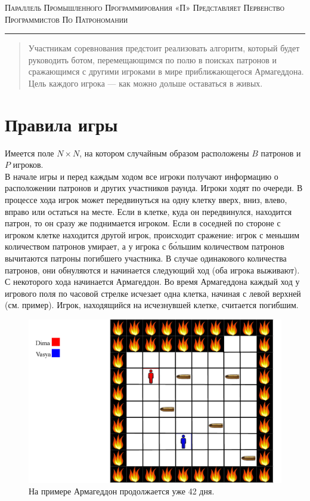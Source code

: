 \documentclass[a4paper,12pt]{article}
\begin{document}
\begin{center}
{\small\textsc{Параллель Промышленного Программирования «П» Представляет Первенство Программистов По Патрономании}}

\vskip 3pt \hrule \vskip 10pt

\end{center}
\begin{abstract}
Участникам соревнования предстоит реализовать алгоритм, который будет руководить ботом, перемещающимся по полю в поисках патронов и сражающимся с другими игроками в мире приближающегося Армагеддона. Цель каждого игрока --- как можно дольше оставаться в живых.
\end{abstract}

\section{Правила игры}
Имеется поле $N\times N$, на котором случайным образом расположены $B$ патронов и $P$ игроков. \\ В начале игры и перед каждым ходом все игроки получают информацию о расположении патронов и других участников раунда. Игроки ходят по очереди. В процессе хода игрок может передвинуться на одну клетку вверх, вниз, влево, вправо или остаться на месте. Если в клетке, куда он передвинулся, находится патрон, то он сразу же поднимается игроком. Если в соседней по стороне с игроком клетке находится другой игрок, происходит сражение: игрок с меньшим количеством патронов умирает, а у игрока с б\'{о}льшим количеством патронов вычитаются патроны погибшего участника. В случае одинакового количества патронов, они обнуляются и начинается следующий ход (оба игрока выживают). С некоторого хода начинается Армагеддон. Во время Армагеддона каждый ход у игрового поля по часовой стрелке исчезает одна клетка, начиная с левой верхней (см. пример). Игрок, находящийся на исчезнувшей клетке, считается погибшим.
\begin{center}
\begin{figure}[h]
\includegraphics[width=150mm]{example1.png}
\caption{На примере Армагеддон продолжается уже 42 дня.}
\end{figure}
\end{center}
\end{document}
